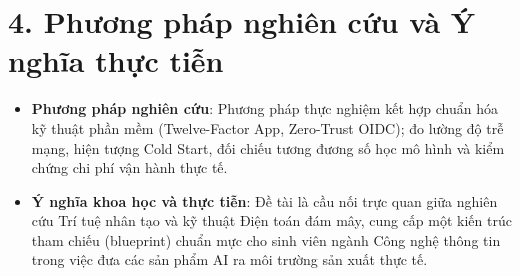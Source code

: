 \section*{4. Phương pháp nghiên cứu và Ý nghĩa thực tiễn}
\begin{itemize}
    \item \textbf{Phương pháp nghiên cứu}: Phương pháp thực nghiệm kết hợp chuẩn hóa kỹ thuật phần mềm (Twelve-Factor App, Zero-Trust OIDC); đo lường độ trễ mạng, hiện tượng Cold Start, đối chiếu tương đương số học mô hình và kiểm chứng chi phí vận hành thực tế.
    \item \textbf{Ý nghĩa khoa học và thực tiễn}: Đề tài là cầu nối trực quan giữa nghiên cứu Trí tuệ nhân tạo và kỹ thuật Điện toán đám mây, cung cấp một kiến trúc tham chiếu (blueprint) chuẩn mực cho sinh viên ngành Công nghệ thông tin trong việc đưa các sản phẩm AI ra môi trường sản xuất thực tế.
\end{itemize}
